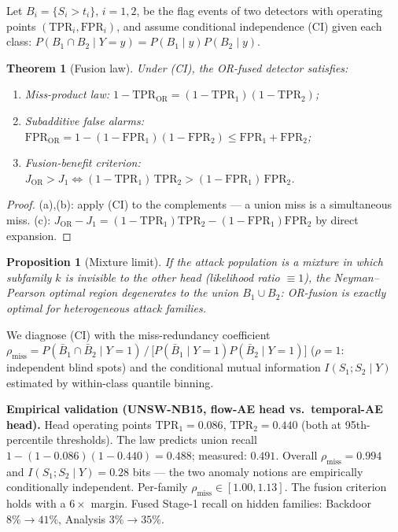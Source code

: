 \documentclass[journal]{IEEEtran}
\newtheorem{theorem}{Theorem}
\newtheorem{proposition}{Proposition}
\newcommand{\TPR}{\mathrm{TPR}}
\newcommand{\FPR}{\mathrm{FPR}}
\newcommand{\OR}{\mathrm{OR}}
\begin{document}
Let $B_i=\{S_i>t_i\}$, $i=1,2$, be the flag events of two detectors with
operating points $(\TPR_i,\FPR_i)$, and assume conditional independence (CI)
given each class: $P(B_1\cap B_2\mid Y{=}y)=P(B_1\mid y)P(B_2\mid y)$.

\begin{theorem}[Fusion law]\label{thm:fusion}
Under (CI), the OR-fused detector satisfies:
\begin{enumerate}
  \item[(a)] \emph{Miss-product law:}\quad
  $1-\TPR_{\OR} = (1-\TPR_1)(1-\TPR_2)$;
  \item[(b)] \emph{Subadditive false alarms:}\quad
  $\FPR_{\OR} = 1-(1-\FPR_1)(1-\FPR_2) \le \FPR_1+\FPR_2$;
  \item[(c)] \emph{Fusion-benefit criterion:}\quad
  $J_{\OR} > J_1 \iff (1-\TPR_1)\,\TPR_2 > (1-\FPR_1)\,\FPR_2$.
\end{enumerate}
\end{theorem}

\begin{proof}
(a),(b): apply (CI) to the complements --- a union miss is a simultaneous miss.
(c): $J_{\OR}-J_1 = (1-\TPR_1)\TPR_2-(1-\FPR_1)\FPR_2$ by direct expansion.
\end{proof}

\begin{proposition}[Mixture limit]\label{prop:mixture}
If the attack population is a mixture in which subfamily $k$ is invisible to
the other head (likelihood ratio $\equiv 1$), the Neyman--Pearson optimal
region degenerates to the union $B_1\cup B_2$: OR-fusion is exactly optimal
for heterogeneous attack families.
\end{proposition}

We diagnose (CI) with the miss-redundancy coefficient
$\rho_{\mathrm{miss}} = P(\bar B_1\cap\bar B_2\mid Y{=}1)\,/\,
\bigl[P(\bar B_1\mid Y{=}1)P(\bar B_2\mid Y{=}1)\bigr]$
($\rho=1$: independent blind spots) and the conditional mutual information
$I(S_1;S_2\mid Y)$ estimated by within-class quantile binning.

\textbf{Empirical validation (UNSW-NB15, flow-AE head vs.\ temporal-AE head).}
Head operating points $\TPR_1=0.086$, $\TPR_2=0.440$ (both at
95th-percentile thresholds). The law predicts union recall
$1-(1-0.086)(1-0.440)=0.488$; measured: $0.491$. Overall
$\rho_{\mathrm{miss}}=0.994$ and $I(S_1;S_2\mid Y)=0.28$ bits --- the two
anomaly notions are empirically conditionally independent. Per-family
$\rho_{\mathrm{miss}}\in[1.00,1.13]$. The fusion criterion holds with a
$6\times$ margin. Fused Stage-1 recall on hidden families: Backdoor
$8\%\!\to\!41\%$, Analysis $3\%\!\to\!35\%$.
\end{document}
